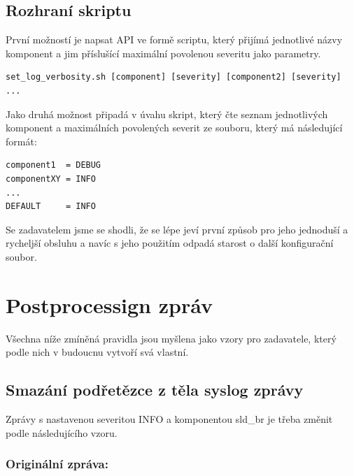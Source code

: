 \documentclass[thesis=B,czech]{FITthesis}[2012/06/26]
\begin{document}
\subsection{Rozhraní skriptu}
První možností je napsat API ve formě scriptu, který přijímá jednotlivé názvy komponent a jim příslušící maximální povolenou severitu jako parametry.
\begin{scriptsize}
\begin{verbatim}
set_log_verbosity.sh [component] [severity] [component2] [severity] ...
\end{verbatim}
\end{scriptsize}

Jako druhá možnost připadá v úvahu skript, který čte seznam jednotlivých komponent a maximálních povolených severit ze souboru, který má následující formát:

\begin{scriptsize}
\begin{verbatim}
/etc/logging.conf
\end{verbatim}}
\end{scriptsize}

\begin{scriptsize}
\begin{verbatim}
component1  = DEBUG
componentXY = INFO
...
DEFAULT     = INFO
\end{verbatim}
\end{scriptsize}

Se zadavatelem jsme se shodli, že se lépe jeví první způsob pro jeho jednoduší a rycheljší obsluhu a navíc s jeho použitím odpadá starost o další konfigurační soubor.

\section{Postprocessign zpráv}
Všechna níže zmíněná pravidla jsou myšlena jako vzory pro zadavatele, který podle nich v budoucnu vytvoří svá vlastní.
\subsection{Smazání podřetězce z těla syslog zprávy}
Zprávy s nastavenou severitou INFO a komponentou sld\_br je třeba změnit podle následujícího vzoru.

\subsubsection*{Originální zpráva:}
\begin{scriptsize}
\begin{verbatim}
2016-02-18T14:05:24+01:00 cc-b8-f1-00-6f-07 sld_br: id=559 
:[stbhal.cpp:debug:520]: INFO: [94mDEBUG: InformationService:
 Reading 'nangu.video.forcedScart': false[0m
\end{verbatim}}
\end{scriptsize}
\end{document}
